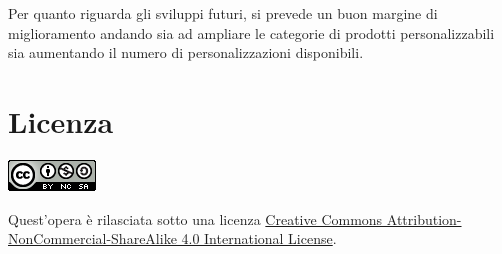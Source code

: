 \documentclass[12pt,italian,]{report}
\begin{document}
Per quanto riguarda gli sviluppi futuri, si prevede un buon margine di miglioramento andando sia ad ampliare le categorie di prodotti personalizzabili sia aumentando il numero di personalizzazioni disponibili.

\hypertarget{licenza}{%
\chapter{Licenza}\label{licenza}}

\includegraphics{img/licenza.png}

Quest'opera è rilasciata sotto una licenza
\href{https://creativecommons.org/licenses/by-nc-sa/4.0/}{Creative
Commons Attribution-NonCommercial-ShareAlike 4.0 International License}.



\end{document}
